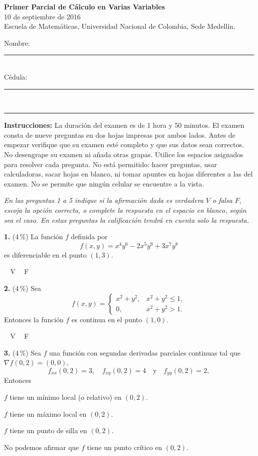 \documentclass[11pt]{article}
\newcommand{\examheader}{%
  \noindent
  \begin{minipage}[t]{0.62\linewidth}
    {\bfseries\large Primer Parcial de C\'alculo en Varias Variables}\\
    {\small 10 de septiembre de 2016}\\
    {\small Escuela de Matem\'aticas, Universidad Nacional de Colombia, Sede Medell\'in.}
  \end{minipage}%
  \hfill
  \begin{minipage}[t]{0.33\linewidth}
    \raggedleft\small
    Nombre: \rule{2.8cm}{0.4pt}\\[4pt]
    C\'edula: \rule{2.8cm}{0.4pt}
  \end{minipage}\\[4pt]
  \rule{\linewidth}{0.6pt}
}
\begin{document}
\examheader

\textbf{Instrucciones:} La duraci\'on del examen es de 1 hora y 50 minutos. El examen consta de nueve preguntas en dos hojas impresas por ambos lados. Antes de empezar verifique que su examen est\'e completo y que sus datos sean correctos. No desengrape su examen ni a\~nada otras grapas. Utilice los espacios asignados para resolver cada pregunta. No est\'a permitido: hacer preguntas, usar calculadoras, sacar hojas en blanco, ni tomar apuntes en hojas diferentes a las del examen. No se permite que ning\'un celular se encuentre a la vista.

\bigskip

\textit{En las preguntas 1 a 5 indique si la afirmaci\'on dada es verdadera $\boxed{V}$ o falsa $\boxed{F}$, escoja la opci\'on correcta, o complete la respuesta en el espacio en blanco, seg\'un sea el caso. En estas preguntas la calificaci\'on tendr\'a en cuenta solo la respuesta.}

\bigskip
\noindent\textbf{1.} (4\,\%) La funci\'on $f$ definida por
$$f(x,y) = x^4y^6 - 2x^5y^9 + 3x^7y^8$$
es diferenciable en el punto $(1,3)$.

\hspace{2cm}$\boxed{\phantom{V}}$ V \qquad $\boxed{\phantom{V}}$ F

\bigskip
\noindent\textbf{2.} (4\,\%) Sea
$$
f(x,y)=
\begin{cases}
x^2+y^2, & x^2+y^2\leq 1,\\
0, & x^2+y^2>1.
\end{cases}
$$
Entonces la funci\'on $f$ es continua en el punto $(1,0)$.

\hspace{2cm}$\boxed{\phantom{V}}$ V \qquad $\boxed{\phantom{V}}$ F

\bigskip
\noindent\textbf{3.} (4\,\%) Sea $f$ una funci\'on con segundas derivadas parciales continuas tal que $\nabla f(0,2)=(0,0)$,
$$f_{xx}(0,2)=3,\quad f_{xy}(0,2)=4 \quad \text{y} \quad f_{yy}(0,2)=2,$$
Entonces

\begin{opciones}
  \item $f$ tiene un m\'inimo local (o relativo) en $(0,2)$.
  \item $f$ tiene un m\'aximo local en $(0,2)$.
  \item $f$ tiene un punto de silla en $(0,2)$.
  \item No podemos afirmar que $f$ tiene un punto cr\'itico en $(0,2)$.
\end{opciones}
\end{document}
